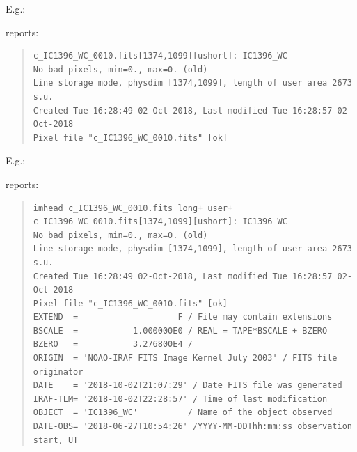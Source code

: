 \documentclass[letter,11pt,oneside]{article}
\begin{document}
E.g.:

\begin{quote}
{\color{verbcolor}{\verb#imhead c_IC1396_WC_0010.fits long+#}}
\end{quote}

reports:

{\color{darkgreen}
\begin{quote}
\begingroup \fontsize{8pt}{8pt}
\selectfont
\begin{verbatim}
c_IC1396_WC_0010.fits[1374,1099][ushort]: IC1396_WC
No bad pixels, min=0., max=0. (old)
Line storage mode, physdim [1374,1099], length of user area 2673 s.u.
Created Tue 16:28:49 02-Oct-2018, Last modified Tue 16:28:57 02-Oct-2018
Pixel file "c_IC1396_WC_0010.fits" [ok]
\end{verbatim}
\endgroup
\end{quote}
}
E.g.:

\begin{quote}
{\color{verbcolor}{\verb#imhead c_IC1396_WC_0010.fits long+ user+#}}
\end{quote}

reports:
{\color{darkgreen}
\begin{quote}
\begingroup \fontsize{8pt}{8pt}
\selectfont
\begin{verbatim}
imhead c_IC1396_WC_0010.fits long+ user+
c_IC1396_WC_0010.fits[1374,1099][ushort]: IC1396_WC
No bad pixels, min=0., max=0. (old)
Line storage mode, physdim [1374,1099], length of user area 2673 s.u.
Created Tue 16:28:49 02-Oct-2018, Last modified Tue 16:28:57 02-Oct-2018
Pixel file "c_IC1396_WC_0010.fits" [ok]
EXTEND  =                    F / File may contain extensions
BSCALE  =           1.000000E0 / REAL = TAPE*BSCALE + BZERO
BZERO   =           3.276800E4 /
ORIGIN  = 'NOAO-IRAF FITS Image Kernel July 2003' / FITS file originator
DATE    = '2018-10-02T21:07:29' / Date FITS file was generated
IRAF-TLM= '2018-10-02T22:28:57' / Time of last modification
OBJECT  = 'IC1396_WC'          / Name of the object observed
DATE-OBS= '2018-06-27T10:54:26' /YYYY-MM-DDThh:mm:ss observation start, UT
\end{verbatim}
\endgroup
\end{quote}
}
\clearpage
\end{document}
